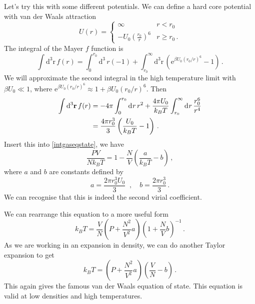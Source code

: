 \documentclass{article}
\theoremstyle{plain}\theoremheaderfont{\normalfont\bfseries}\theorembodyfont{\rmfamily}\theoremseparator{.}\newtheorem*{thm}{Theorem}\newtheorem*{law}{Law}\newtheorem*{pos}{Postulate}
\numberwithin{equation}{section}
\newcommand{\ee}{\mathrm{e}}
\newcommand{\dd}[2][]{\mathrm{d}^{#1} #2\,}
\newcommand{\vb}[1]{\bm{\mathrm{#1}}}
\begin{document}
    Let's try this with some different potentials. We can define a hard core potential with van der Waals attraction
    \begin{equation}
        U(r)=\begin{cases}
            \infty & r< r_0 \\
            -U_0\left(\frac{r_0}{r}\right)^6 & r\ge r_0\,.
        \end{cases}
    \end{equation}
    The integral of the Mayer \(f\) function is
    \begin{equation}
        \int\dd[3]{\vb{r}}f(r)=\int_{0}^{r_0}\dd[3]\vb{r}(-1)+\int_{r_0}^{\infty}\dd[3]{\vb{r}}\left(\ee^{\beta U_0(r_0/r)^6}-1\right)\,.
    \end{equation}
    We will approximate the second integral in the high temperature limit with \(\beta U_0\ll 1\), where \(\ee^{\beta U_0(r_0/r)^6}\approx 1+\beta U_0(r_0/r)^6\). Then
    \begin{align}
        \int\dd[3]{\vb{r}}f(r)&=-4\pi\int_{0}^{r_0}\dd{r}r^2+\frac{4\pi U_0}{k_BT}\int_{r_0}^{\infty}\dd{r}\frac{r_0^6}{r^4}\notag\\
        &=\frac{4\pi r_0^3}{3}\left(\frac{U_0}{k_BT}-1\right)\,.
    \end{align}
    Insert this into \cref{intgaseqstate}, we have
    \begin{equation}
        \frac{PV}{Nk_BT}=1-\frac{N}{V}\left(\frac{a}{k_BT}-b\right)\,,
    \end{equation}
    where \(a\) and \(b\) are constants defined by
    \begin{equation}
        a=\frac{2\pi r_0^3 U_0}{3}\;\;,\quad b=\frac{2\pi r_0^3}{3}\,.
    \end{equation}
    We can recognise that this is indeed the second virial coefficient.

    We can rearrange this equation to a more useful form
    \begin{equation}
        k_BT=\frac{V}{N}\left(P+\frac{N^2}{V^2}a\right)\left(1+\frac{N}{V}b\right)^{-1}\,.
    \end{equation}
    As we are working in an expansion in density, we can do another Taylor expansion to get
    \begin{equation}\label{vanderwaals}
        k_BT=\left(P+\frac{N^2}{V^2}a\right)\left(\frac{V}{N}-b\right)\,.
    \end{equation}
    This again gives the famous van der Waals equation of state. This equation is valid at low densities and high temperatures.
\end{document}
